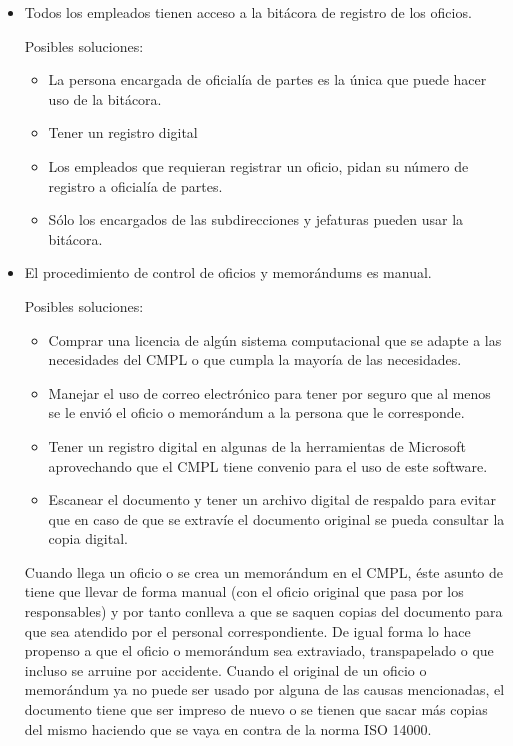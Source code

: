 \begin{itemize}
	\item Todos los empleados tienen acceso a la bitácora de registro de los oficios.
	
	Posibles soluciones:
	\begin{itemize}
		\item La persona encargada de oficialía de partes es la única que puede hacer uso de la bitácora.
		\item Tener un registro digital 
		\item Los empleados que requieran registrar un oficio, pidan su número de registro a oficialía de partes.
		\item Sólo los encargados de las subdirecciones y jefaturas pueden usar la bitácora.
	\end{itemize}
	
	\item El procedimiento de control de oficios y memorándums es manual.
	
	Posibles soluciones:
	\begin{itemize}
		\item Comprar una licencia de algún sistema computacional que se adapte a las necesidades del CMPL o que cumpla la mayoría de las necesidades.
		\item Manejar el uso de correo electrónico para tener por seguro que al menos se le envió el oficio o memorándum a la persona que le corresponde.
		\item Tener un registro digital en algunas de la herramientas de Microsoft aprovechando que el CMPL tiene convenio para el uso de este software.
		\item Escanear el documento y tener un archivo digital de respaldo para evitar que en caso de que se extravíe el documento original se pueda consultar la copia digital.
	\end{itemize}	
	
Cuando llega un oficio o se crea un memorándum en el CMPL, éste asunto de tiene que llevar de forma manual (con el oficio original que pasa por los responsables) y por tanto conlleva a que se saquen copias del documento para que sea atendido por el personal correspondiente. De igual forma lo hace propenso a que el oficio o memorándum sea extraviado, transpapelado o que incluso se arruine por accidente. Cuando el original de un oficio o memorándum ya no puede ser usado por alguna de las causas mencionadas, el documento tiene que ser impreso de nuevo o se tienen que sacar más copias del mismo haciendo que se vaya en contra de la norma ISO 14000.


\end{itemize}
